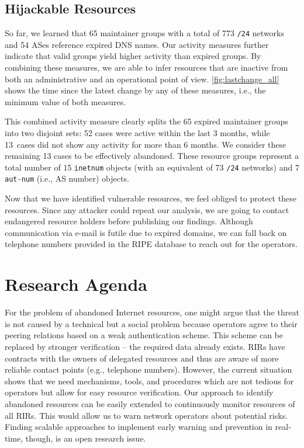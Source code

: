 \documentclass{llncs}
\let\orgautoref\autoref
\renewcommand{\autoref}
{\def\sectionautorefname{Section}\orgautoref}
\begin{document}
\subsection{Hijackable Resources}
So far, we learned that 65 maintainer groups with a total of 773 \texttt{/24} networks and 54 ASes reference expired DNS names. Our activity measures further indicate that valid groups yield higher activity than expired groups. By combining these measures, we are able to infer resources that are inactive from both an administrative and an operational point of view. \autoref{fig:lastchange_all} shows the time since the latest change by any of these measures, i.e., the minimum value of both measures.

This combined activity measure clearly splits the 65 expired maintainer groups into two disjoint sets: 52 cases were active within the last 3 months, while 13~cases did not show any activity for more than 6 months. We consider these remaining 13 cases to be effectively abandoned. These resource groups represent a total number of 15 \texttt{inetnum} objects (with an equivalent of 73 \texttt{/24} networks) and 7 \texttt{aut-num} (i.e., AS number) objects. 

Now that we have identified vulnerable resources, we feel obliged to protect these resources. Since any attacker could repeat our analysis, we are going to contact endangered resource holders before publishing our findings. Although communication via e-mail is futile due to expired domains, we can fall back on telephone numbers provided in the RIPE database to reach out for the operators.

\section{Research Agenda} \label{sec:research} For the problem of abandoned
Internet resources, one might argue that the threat is not caused by a
technical but a social problem because operators agree to their peering
relations based on a weak authentication scheme. This scheme can be replaced by
stronger verification -- the required data already exists. RIRs have contracts
with the owners of delegated resources and thus are aware of more reliable
contact points (e.g., telephone numbers). However, the current situation shows
that we need mechanisms, tools, and procedures which are not tedious for
operators but allow for easy resource verification. Our approach to identify
abandoned resources can be easily extended to continuously monitor resources of
all RIRs. This would allow us to warn network operators about potential risks.
Finding scalable approaches to implement early warning and prevention in
real-time, though, is an open research issue.
\end{document}
